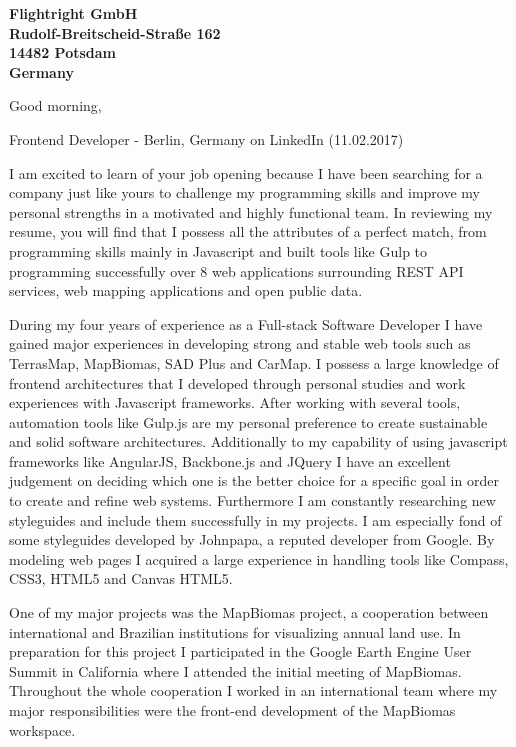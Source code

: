 \documentclass[a4paper]{joaosoares-letter}
\begin{document}
\longindentation=0pt

\begin{letter}{\bfseries Flightright GmbH\\Rudolf-Breitscheid-Straße 162\\14482 Potsdam \\Germany}


\date{Belém, \today}

\opening{Good morning,}{Frontend Developer - Berlin, Germany on LinkedIn (11.02.2017)}

	I am excited to learn of your job opening because I have been searching for a company just like yours to challenge my programming skills and improve my personal strengths in a motivated and highly functional team. In reviewing my resume, you will find that I possess all the attributes of a perfect match, from programming skills mainly in Javascript and built tools like Gulp to programming successfully over 8 web applications surrounding REST API services, web mapping applications and open public data.  

	During my four years of experience as a Full-stack Software Developer I have gained major experiences in developing strong and stable web tools such as TerrasMap, MapBiomas, SAD Plus and CarMap. I possess a large knowledge of frontend architectures that I developed through personal studies and work experiences with Javascript frameworks. After working with several tools, automation tools like Gulp.js are my personal preference to create sustainable and solid software architectures. Additionally to my capability of using javascript frameworks like AngularJS, Backbone.js and JQuery I have an excellent judgement on deciding which one is the better choice for a specific goal in order to create and refine web systems. Furthermore I am constantly researching new styleguides and include them successfully in my projects. I am especially fond of some styleguides developed by Johnpapa, a reputed developer from Google. By modeling web pages I acquired a large experience in handling tools like Compass, CSS3, HTML5 and Canvas HTML5.

One of my major projects was the MapBiomas project, a cooperation between international and Brazilian institutions for visualizing annual land use. In preparation for this project I participated in the Google Earth Engine User Summit in California where I attended the initial meeting of MapBiomas. Throughout the whole cooperation I worked in an international team where my major responsibilities were the front-end development of the MapBiomas workspace.


\end{letter}
\end{document}
